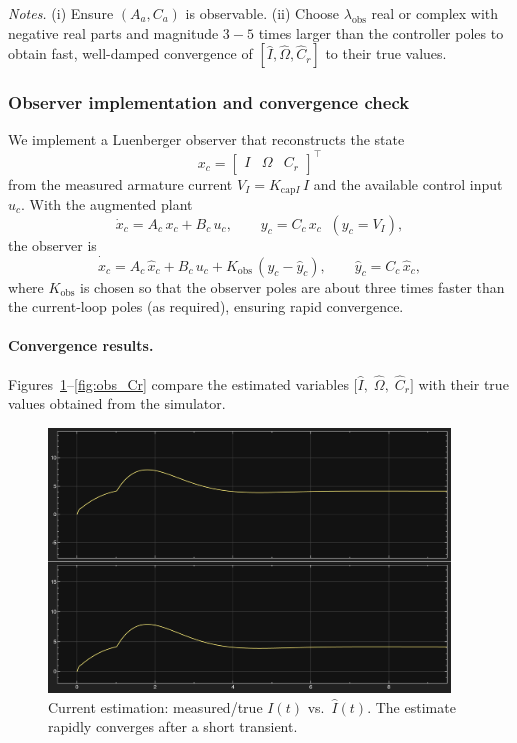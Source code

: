\documentclass{rapportCS}
\begin{document}
\noindent
\textit{Notes.} (i) Ensure \((A_a,C_a)\) is observable. (ii) Choose \(\lambda_{\text{obs}}\) real or complex
with negative real parts and magnitude \(3\!-\!5\) times larger than the controller poles to obtain fast,
well-damped convergence of \([\hat I,\hat\Omega,\hat C_r]\) to their true values.

\subsubsection{Observer implementation and convergence check}

We implement a Luenberger observer that reconstructs the state
\[
x_c=\begin{bmatrix} I & \Omega & C_r \end{bmatrix}^\top
\]
from the measured armature current $V_I=K_{\mathrm{cap}I}\,I$ and the available control input $u_c$.
With the augmented plant
\[
\dot x_c = A_c\,x_c + B_c\,u_c, \qquad y_c = C_c\,x_c \;\; (y_c=V_I),
\]
the observer is
\[
\dot{\hat x}_c = A_c\,\hat x_c + B_c\,u_c + K_{\mathrm{obs}}\,(y_c-\hat y_c),
\qquad \hat y_c = C_c\,\hat x_c,
\]
where $K_{\mathrm{obs}}$ is chosen so that the observer poles are about three times faster than the
current-loop poles (as required), ensuring rapid convergence.

\paragraph{Convergence results.}
Figures~\ref{fig:obs_I}–\ref{fig:obs_Cr} compare the estimated variables
$\big[\hat I,\;\hat\Omega,\;\hat C_r\big]$ with their true values obtained from the simulator.

\begin{figure}[H]
\centering
\includegraphics[width=0.95\textwidth]{figures/simulinkcurrent.png}
\caption{Current estimation: measured/true $I(t)$ vs.\ $\hat I(t)$. The estimate rapidly converges after a short transient.}
\label{fig:obs_I}
\end{figure}
\end{document}
